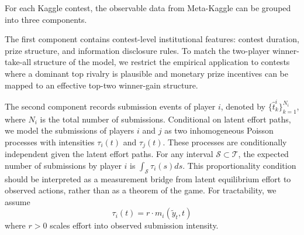 \documentclass[mnsc]{informs3}
\begin{document}
For each Kaggle contest, the observable data from Meta-Kaggle can be grouped into three components.

The first component contains contest-level institutional features: contest duration, prize structure, and information disclosure rules.
To match the two-player winner-take-all structure of the model, we restrict the empirical application to contests where a dominant top rivalry is plausible and monetary prize incentives can be mapped to an effective top-two winner-gain structure.

The second component records submission events of player $i$, denoted by $\{\hat{t}^i_k\}_{k=1}^{N_i}$, where $N_i$ is the total number of submissions.
Conditional on latent effort paths, we model the submissions of players $i$ and $j$ as two inhomogeneous Poisson processes with intensities $\tau_i(t)$ and $\tau_j(t)$. These processes are conditionally independent given the latent effort paths.
For any interval $\mathcal{S}\subset\mathcal{T}$, the expected number of submissions by player $i$ is $\int_{\mathcal{S}}\tau_i(s)ds$.
This proportionality condition should be interpreted as a measurement bridge from latent equilibrium effort to observed actions, rather than as a theorem of the game.
For tractability, we assume
\begin{equation}\label{eq-model-intensity}
\tau_i(t) = r \cdot m_i(\tilde{y}_t, t)
\end{equation}
where $r>0$ scales effort into observed submission intensity.
\end{document}
